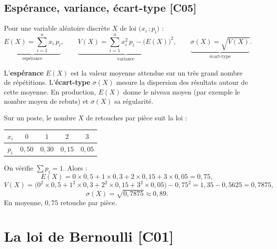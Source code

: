 \documentclass[a4paper,11pt]{article}
\begin{document}
\subsection{Espérance, variance, écart-type \hfill {\normalsize\color{uimmred}[C05]}}

\begin{definition}
Pour une variable aléatoire discrète $X$ de loi $\big(x_i\,;p_i\big)$ :
\[
\underbrace{E(X) = \sum_{i=1}^{n} x_i\,p_i}_{\text{espérance}}, \qquad
\underbrace{V(X) = \sum_{i=1}^{n} x_i^2\,p_i - \big(E(X)\big)^2}_{\text{variance}}, \qquad
\underbrace{\sigma(X) = \sqrt{V(X)}}_{\text{écart-type}}.
\]
\end{definition}

\begin{remarque}[-- Interprétation]
L'\textbf{espérance} $E(X)$ est la valeur moyenne attendue sur un très grand nombre de répétitions. L'\textbf{écart-type} $\sigma(X)$ mesure la dispersion des résultats autour de cette moyenne. En production, $E(X)$ donne le niveau moyen (par exemple le nombre moyen de rebuts) et $\sigma(X)$ sa régularité.
\end{remarque}

\begin{exemple}
Sur un poste, le nombre $X$ de retouches par pièce suit la loi :
\begin{center}
\renewcommand{\arraystretch}{1.3}
\begin{tabular}{|c|c|c|c|c|}
\hline
\rowcolor{uimmlightblue}
$x_i$ & $0$ & $1$ & $2$ & $3$ \\
\hline
$p_i$ & $0{,}50$ & $0{,}30$ & $0{,}15$ & $0{,}05$ \\
\hline
\end{tabular}
\end{center}
On vérifie $\sum p_i = 1$. Alors :
\[
E(X) = 0\times0{,}5 + 1\times0{,}3 + 2\times0{,}15 + 3\times0{,}05 = 0{,}75,
\]
\[
V(X) = \big(0^2\times0{,}5 + 1^2\times0{,}3 + 2^2\times0{,}15 + 3^2\times0{,}05\big) - 0{,}75^2 = 1{,}35 - 0{,}5625 = 0{,}7875,
\]
\[
\sigma(X) = \sqrt{0{,}7875} \approx 0{,}89.
\]
En moyenne, $0{,}75$ retouche par pièce.
\end{exemple}

\newpage
\section{La loi de Bernoulli \hfill {\normalsize\color{uimmred}[C01]}}
\end{document}
